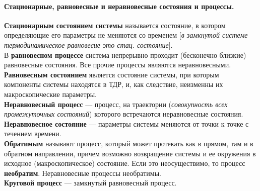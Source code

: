 \paragraph{Стационарные, равновесные и неравновесные состояния и процессы.}
\textbf{Стационарным состоянием системы} называется состояние, в котором определяющие его параметры не меняются со временем [\textit{в замкнутой системе термодинамическое равновесие это стац. состояние}].\\
В \textbf{равновесном процессе} система непрерывно проходит (бесконечно близкие) равновесные состояния. Все прочие процессы являются неравновесными.\\
\textbf{Равновесным состоянием} является состояние системы, при которым компоненты системы находятся в ТДР, и, как следствие, неизменны их макроскопические параметры. \\
\textbf{Неравновесный процесс} --- процесс, на траектории (\textit{совокупность всех промежуточных состояний}) которого встречаются неравновесные состояния.\\
\textbf{Неравновесное состояние} --- параметры системы меняются от точки к точке с течением времени.\\
\textbf{Обратимым} называют процесс, который может протекать как в прямом, там и в обратном направлении, причем возможно возвращение системы и ее окружения в исходное (макроскопическое) состояние. Если это неосуществимо, то процесс \textbf{необратим}. Неравновесные процессы необратимы. \\
\textbf{Круговой процесс} --- замкнутый равновесный процесс.
